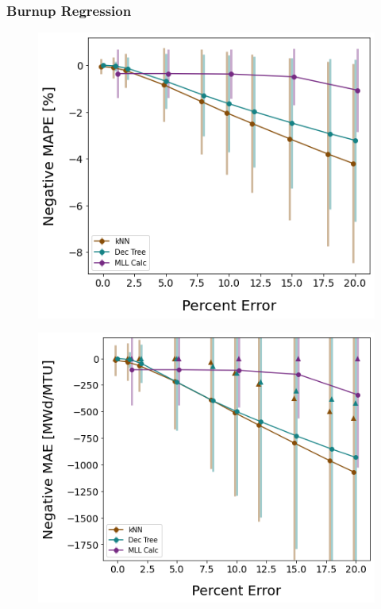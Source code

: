\begin{frame}
  \frametitle{Burnup Regression}
  \begin{adjustwidth}{-15pt}{0pt}
  \begin{minipage}{0.5\textwidth}
    \begin{figure}
      \centering
      \includegraphics[width=\textwidth]{./figures/randerr_compare_nuc29_MAPE_burn.png}
    \end{figure}
  \end{minipage}%
  \hfill
  \begin{minipage}{0.5\textwidth}
    \begin{figure}
      \centering
      \includegraphics[width=\textwidth]{./figures/randerr_compare_nuc29_MAE_burn.png}
    \end{figure}
  \end{minipage}
  \end{adjustwidth}
\end{frame}

